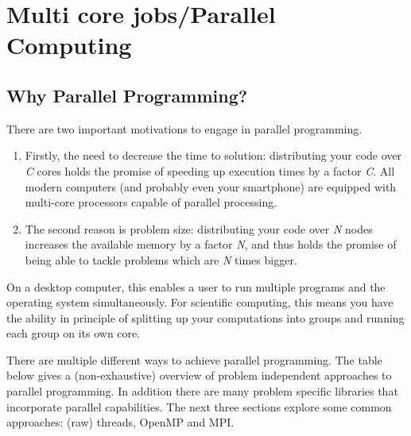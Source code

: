 \chapter{Multi core jobs/Parallel Computing}
\label{ch:multi-core-jobs-parallel-computing}

\section{Why Parallel Programming?}

There are two important motivations to engage in parallel programming.

\begin{enumerate}

\item  Firstly, the need to decrease the time to solution: distributing your
  code over \emph{C} cores holds the promise of speeding up execution times
  by a factor \emph{C}. All modern computers (and probably even your
  smartphone) are equipped with multi-core processors capable of parallel
  processing.
\item  The second reason is problem size: distributing your code over
  \emph{N} nodes increases the available memory by a factor \emph{N}, and
  thus holds the promise of being able to tackle problems which are \emph{N}
  times bigger.
\end{enumerate}

On a desktop computer, this enables a user to run multiple programs and the
operating system simultaneously. For scientific computing, this means you have
the ability in principle of splitting up your computations into groups and
running each group on its own core.

There are multiple different ways to achieve parallel programming. The table
below gives a (non-exhaustive) overview of problem independent approaches to
parallel programming. In addition there are many problem specific libraries
that incorporate parallel capabilities. The next three sections explore some
common approaches: (raw) threads, OpenMP and MPI.

